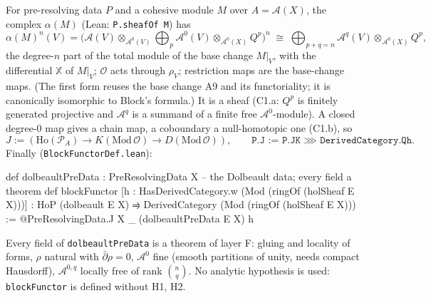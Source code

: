 \documentclass[11pt,a4paper]{article}
\newcommand{\code}[1]{\texttt{#1}}
\newcommand{\cA}{\mathcal{A}}
\newcommand{\Ocal}{\mathcal{O}}
\newcommand{\dbar}{\bar\partial}
\newcommand{\Ho}{\mathrm{Ho}}
\newcommand{\X}{\mathbb{X}}
\begin{document}
For pre-resolving data $P$ and a cohesive module $M$ over $A=\cA(X)$, the complex
$\alpha(M)$ (Lean: \code{P.sheafOf M}) has
\[ \alpha(M)^n(V) = \bigl(\cA(V)\otimes_{\cA^0(V)}\textstyle\bigoplus_p \cA^0(V)\otimes_{\cA^0(X)}Q^p\bigr)^n
\;\cong\; \textstyle\bigoplus_{p+q=n}\cA^q(V)\otimes_{\cA^0(X)}Q^p, \]
the degree-$n$ part of the total module of the base change $M|_V$, with the differential $\X$ of
$M|_V$; $\Ocal$ acts through $\rho_V$; restriction maps are the base-change maps. (The first form
reuses the base change A9 and its functoriality; it is canonically isomorphic to Block's
formula.) It is a sheaf (C1.a: $Q^p$ is finitely generated projective and $\cA^q$ is a summand of
a finite free $\cA^0$-module). A closed degree-0 map gives a chain map, a coboundary a
null-homotopic one (C1.b), so
\[ J := (\Ho(\mathcal P_A)\to K(\mathrm{Mod}\,\Ocal)\to D(\mathrm{Mod}\,\Ocal)),\qquad
\code{P.J := P.JK ⋙ DerivedCategory.Qh}. \]
Finally (\code{BlockFunctorDef.lean}):
\begin{lean}
def dolbeaultPreData : PreResolvingData X   -- the Dolbeault data; every field a theorem
def blockFunctor [h : HasDerivedCategory.{w} (Mod (ringOf (holSheaf E X)))] :
    HoP (dolbeault E X) ⥤ DerivedCategory (Mod (ringOf (holSheaf E X))) :=
  @PreResolvingData.J X _ (dolbeaultPreData E X) h
\end{lean}
Every field of \code{dolbeaultPreData} is a theorem of layer F: gluing and locality of forms,
$\rho$ natural with $\dbar\rho=0$, $\cA^0$ fine (smooth partitions of unity, needs compact
Hausdorff), $\cA^{0,q}$ locally free of rank $\binom nq$. No analytic hypothesis is used:
\code{blockFunctor} is defined without H1, H2.
\end{document}
